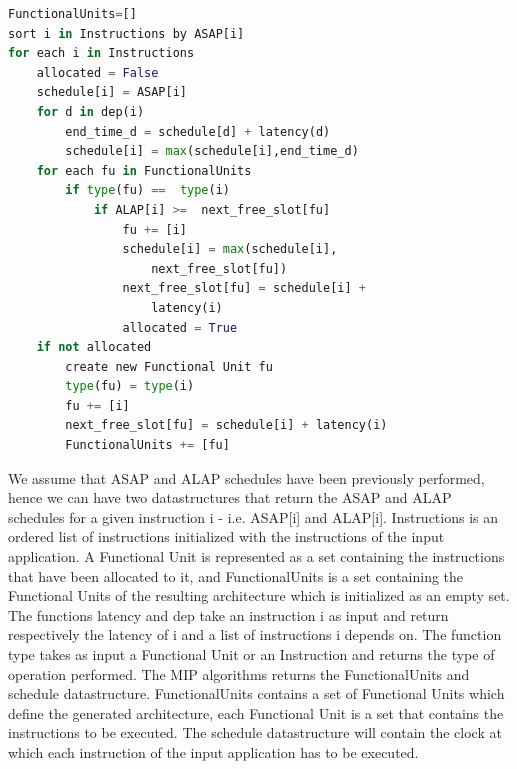 \begin{lstlisting}[language=Python, caption={Modified Interval Partitioning Algorithm}, label={lst:modified_interval_partitioning}]
FunctionalUnits=[]
sort i in Instructions by ASAP[i]
for each i in Instructions
	allocated = False
	schedule[i] = ASAP[i]
	for d in dep(i)
		end_time_d = schedule[d] + latency(d)
		schedule[i] = max(schedule[i],end_time_d)
	for each fu in FunctionalUnits 
		if type(fu) ==  type(i)
			if ALAP[i] >=  next_free_slot[fu]
				fu += [i]
				schedule[i] = max(schedule[i],
					next_free_slot[fu])
				next_free_slot[fu] = schedule[i] + 
					latency(i)
				allocated = True
	if not allocated
		create new Functional Unit fu
		type(fu) = type(i)
		fu += [i]
		next_free_slot[fu] = schedule[i] + latency(i)
		FunctionalUnits += [fu]

\end{lstlisting}
We assume that ASAP and ALAP schedules have been previously performed, hence we can have two datastructures that return the ASAP and ALAP schedules for a given instruction i - i.e. ASAP[i] and ALAP[i]. Instructions is an ordered list of instructions initialized with the instructions of the input application. A Functional Unit is represented as a set containing the instructions that have been allocated to it, and FunctionalUnits is a set containing the Functional Units of the resulting architecture which is initialized as an empty set. The functions latency and dep take an instruction i as input and return respectively the latency of i and a list of instructions i depends on. The function type
takes as input a Functional Unit or an Instruction and returns the type of operation performed.
The MIP algorithms returns the FunctionalUnits and schedule datastructure. FunctionalUnits contains a set of Functional Units which define the generated architecture, each Functional Unit is a set that contains the instructions to be executed. The schedule datastructure will contain the clock at which each instruction of the input application has to be executed.

